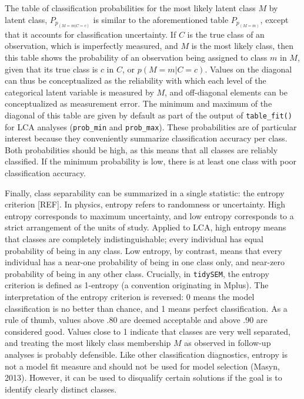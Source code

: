 \documentclass[
  ,man,floatsintext]{apa6}
\begin{document}
The table of classification probabilities for the most likely latent class \(M\) by latent class, \(P_{p_{(M = m | C = c)}}\) is similar to the aforementioned table \(P_{p_{(M = m)}}\),
except that it accounts for classification uncertainty.
If \(C\) is the true class of an observation, which is imperfectly measured,
and \(M\) is the most likely class,
then this table shows the probability of an observation being assigned to class \(m\) in \(M\), given that its true class is \(c\) in \(C\), or \(p(M=m|C=c)\).
Values on the diagonal can thus be conceptualized as the reliability with which each level of the categorical latent variable is measured by \(M\),
and off-diagonal elements can be conceptualized as measurement error.
The minimum and maximum of the diagonal of this table are given by default as part of the output of \texttt{table\_fit()} for LCA analyses (\texttt{prob\_min} and \texttt{prob\_max}).
These probabilities are of particular interest because they conveniently summarize classification accuracy per class.
Both probabilities should be high, as this means that all classes are reliably classified.
If the minimum probability is low,
there is at least one class with poor classification accuracy.

Finally, class separability can be summarized in a single statistic:
the entropy criterion {[}REF{]}.
In physics, entropy refers to randomness or uncertainty.
High entropy corresponds to maximum uncertainty,
and low entropy corresponds to a strict arrangement of the units of study.
Applied to LCA, high entropy means that classes are completely indistinguishable; every individual has equal probability of being in any class.
Low entropy, by contrast, means that every individual has a near-one probability of being in one class only, and near-zero probability of being in any other class.
Crucially, in \texttt{tidySEM}, the entropy criterion is defined as 1-entropy (a convention originating in Mplus).
The interpretation of the entropy criterion is reversed:
0 means the model classification is no better than chance,
and 1 means perfect classification.
As a rule of
thumb, values above .80 are deemed acceptable and above .90 are considered good.
Values close to 1 indicate that classes are very well separated,
and treating the most likely class membership \(M\) as observed in follow-up analyses is probably defensible.
Like other classification diagnostics,
entropy is not a model fit measure and should not be used for model selection (Masyn, 2013).
However, it can be used to disqualify certain solutions if the goal is to identify clearly distinct classes.
\end{document}
